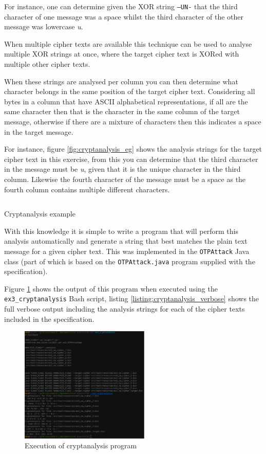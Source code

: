 \documentclass[a4paper]{article}
\begin{document}
For instance, one can determine given the XOR string
\texttt{--UN-} that the third character of one message was a space whilst the
third character of the other message was lowercase \textit{u}.

When multiple cipher texts are available this technique can be used to analyse
multiple XOR strings at once, where the target cipher text is XORed with
multiple other cipher texts.

When these strings are analysed per column you can then determine what character
belongs in the same position of the target cipher text. Considering all bytes in
a column that have ASCII alphabetical representations, if all are the same
character then that is the character in the same column of the target message,
otherwise if there are a mixture of characters then this indicates a space in
the target message.

For instance, figure \ref{fig:cryptanalysis_eg} shows the analysis strings for
the target cipher text in this exercise, from this you can determine that the
third character in the message must be \textit{u}, given that it is the unique
character in the third column. Likewise the fourth character of the message must
be a space as the fourth column contains multiple different characters.

\begin{listing}
  \inputminted[frame=lines,fontsize=\scriptsize,firstline=52,lastline=57]{text}{listings/ex3_cryptanalysis_1.txt}
  \caption{Cryptanalysis example}
  \label{listing:cryptanalysis_eg}
\end{listing}
\FloatBarrier

With this knowledge it is simple to write a program that will perform this
analysis automatically and generate a string that best matches the plain text
message for a given cipher text. This was implemented in the \texttt{OTPAttack}
Java class (part of which is based on the \texttt{OTPAttack.java} program
supplied with the specification).

Figure \ref{fig:cryptanalysis} shows the output of this program when executed
using the \texttt{ex3\_cryptanalysis} Bash script, listing
\ref{listing:cryptanalysis_verbose} shows the full verbose output including the
analysis strings for each of the cipher texts included in the specification.

\begin{figure}[h!]
  \centering
  \includegraphics[width=0.55\textwidth]{graphics/ex3_cryptanalysis_1.eps}
  \caption{Execution of cryptanalysis program}
  \label{fig:cryptanalysis}
\end{figure}
\end{document}
